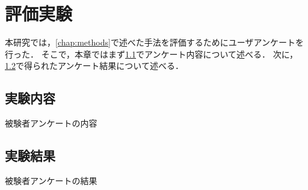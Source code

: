 \documentclass[\homedir/main.tex]{subfiles}
\begin{document}
\setcounter{chapter}{4}
\chapter{評価実験}\label{chap:experiment}
本研究では，\cref{chap:methods}で述べた手法を評価するためにユーザアンケートを行った．
そこで，本章ではまず\cref{sec:experimental_details}でアンケート内容について述べる．
次に，\cref{sec:experimental_results}で得られたアンケート結果について述べる．


\section{実験内容}\label{sec:experimental_details}
被験者アンケートの内容


\section{実験結果}\label{sec:experimental_results}
被験者アンケートの結果


\printBibForSubfiles
\end{document}
